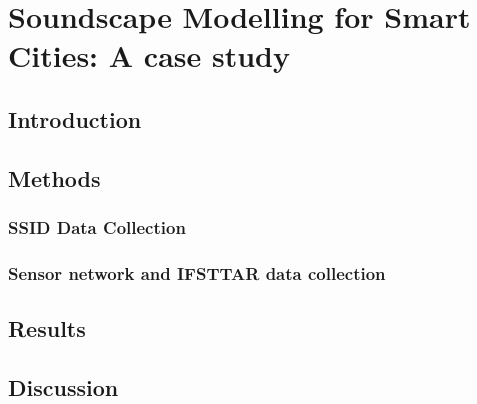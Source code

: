 \chapter{Soundscape Modelling for Smart Cities: A case study}
\label{ch:smart}

\section{Introduction}

\section{Methods}
  \subsection{SSID Data Collection}
  \subsection{Sensor network and IFSTTAR data collection}

\section{Results}

\section{Discussion}

